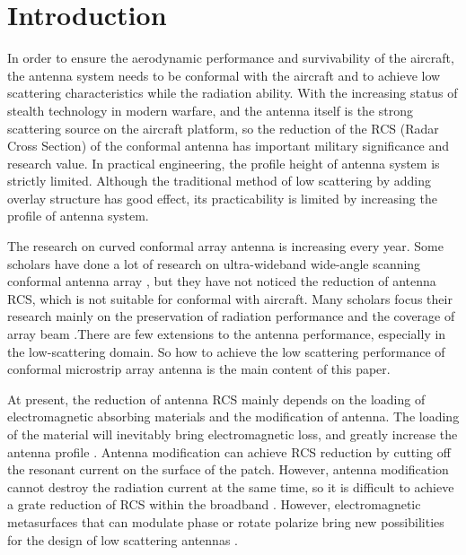 \documentclass[USenglish]{article}
\theoremstyle{dgthm}
\theoremstyle{dgdef}
\begin{document}
	
\section{Introduction} 

In order to ensure the aerodynamic performance and survivability of the aircraft, the antenna system needs to be conformal with the aircraft and to achieve low scattering characteristics while the radiation ability. With the increasing status of stealth technology in modern warfare, and the antenna itself is the strong scattering source on the aircraft platform, so the reduction of the RCS (Radar Cross Section) of the conformal antenna has important military significance and research value. In practical engineering, the profile height of antenna system is strictly limited. Although the traditional method of low scattering by adding overlay structure has good effect, its practicability is limited by increasing the profile of antenna system.


The research on curved conformal array antenna is increasing every year. Some scholars have done a lot of research on ultra-wideband wide-angle scanning conformal antenna array \cite{p1,p2,p3,p4,p5,p6}, but they have not noticed the reduction of antenna RCS, which is not suitable for conformal with aircraft. Many scholars focus their research mainly on the preservation of radiation performance and the coverage of array beam \cite{p7,p8,p9,p10,p11,p12,p13}.There are few extensions to the antenna performance, especially in the low-scattering domain. So how to achieve the low scattering performance of conformal microstrip array antenna is the main content of this paper.


At present, the reduction of antenna RCS mainly depends on the loading of electromagnetic absorbing materials and the modification of antenna. The loading of the material will inevitably bring electromagnetic loss, and greatly increase the antenna profile \cite{p14,p15}. Antenna modification can achieve RCS reduction by cutting off the resonant current on the surface of the patch. However, antenna modification cannot destroy the radiation current at the same time, so it is difficult to achieve a grate reduction of RCS within the broadband \cite{p16,p17}. However, electromagnetic metasurfaces that can modulate phase or rotate polarize bring new possibilities for the design of low scattering antennas \cite{p18}.
\end{document}
